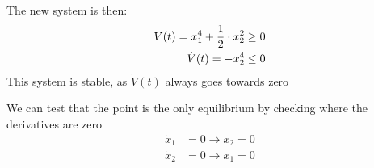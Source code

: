 The new system is then:
\begin{equation}
        \begin{split}
                V(t) = x_{1}^{4} + \frac{1}{2} \cdot x_{2}^{2} \geq 0 \\
                \dot{V}(t) = -x_{2}^{4} \leq 0
        \end{split}
\end{equation}
This system is stable, as $\dot{V}(t)$ always goes towards zero

We can test that the point is the only equilibrium by checking where the derivatives are zero
\begin{equation}
        \begin{split}
                \dot{x}_1 &= 0 \rightarrow x_2 = 0 \\
                \dot{x}_2 &= 0 \rightarrow x_1 = 0
        \end{split}
\end{equation}
